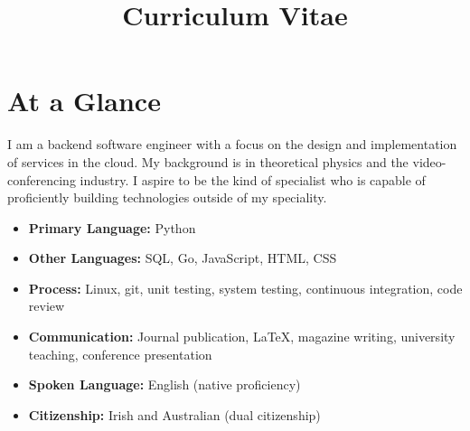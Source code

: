 \documentclass[11pt,a4paper,sans]{moderncv}        %
\title{Curriculum Vitae}
\begin{document}
\makecvtitle

\vspace{-0.9cm}

\section{At a Glance}
\vspace{5pt}
\small{I am a backend software engineer with a focus on the design and implementation of services in the cloud. My background is in theoretical physics and the video-conferencing industry. I aspire to be the kind of specialist who is capable of proficiently building technologies outside of my speciality.}

\begin{itemize}
\item{\small{\textbf{Primary Language:} Python}}
\item{\small{\textbf{Other Languages:} SQL, Go, JavaScript, HTML, CSS}}
\item{\small{\textbf{Process:} Linux, git, unit testing, system testing, continuous integration, code review}}
\item{\small{\textbf{Communication:} Journal publication, \LaTeX, magazine writing, university teaching, conference presentation}}
\item {\small{\textbf{Spoken Language:} English (native proficiency)}}
\item {\small{\textbf{Citizenship:} Irish and Australian (dual citizenship)}}
\end{itemize}
\end{document}
